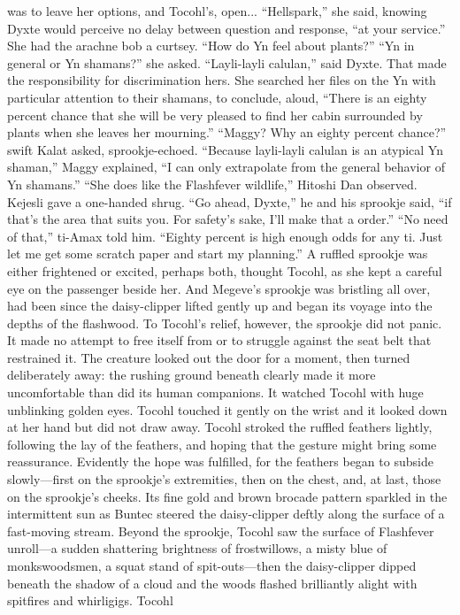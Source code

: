\documentclass[9pt]{article}
\begin{document}
was to leave her options, and Tocohl’s, open...
“Hellspark,” she said, knowing Dyxte would perceive no delay between question and response, “at
your service.” She had the arachne bob a curtsey.
“How do Yn feel about plants?”
“Yn in general or Yn shamans?” she asked.
“Layli-layli calulan,” said Dyxte.
That made the responsibility for discrimination hers. She searched her files on the Yn with particular
attention to their shamans, to conclude, aloud, “There is an eighty percent chance that she will be very
pleased to find her cabin surrounded by plants when she leaves her mourning.”
“Maggy? Why an eighty percent chance?” swift Kalat asked, sprookje-echoed.
“Because layli-layli calulan is an atypical Yn shaman,” Maggy explained, “I can only extrapolate
from the general behavior of Yn shamans.”
“She does like the Flashfever wildlife,” Hitoshi Dan observed.
Kejesli gave a one-handed shrug. “Go ahead, Dyxte,” he and his sprookje said, “if that’s the area
that suits you. For safety’s sake, I’ll make that a order.”
“No need of that,” ti-Amax told him. “Eighty percent is high enough odds for any ti. Just let me get
some scratch paper and start my planning.”
A ruffled sprookje was either frightened or excited, perhaps both, thought Tocohl, as she kept a
careful eye on the passenger beside her. And Megeve’s sprookje was bristling all over, had been since
the daisy-clipper lifted gently up and began its voyage into the depths of the flashwood.
To Tocohl’s relief, however, the sprookje did not panic. It made no attempt to free itself from or to
struggle against the seat belt that restrained it. The creature looked out the door for a moment, then
turned deliberately away: the rushing ground beneath clearly made it more uncomfortable than did its
human companions. It watched Tocohl with huge unblinking golden eyes.
Tocohl touched it gently on the wrist and it looked down at her hand but did not draw away. Tocohl
stroked the ruffled feathers lightly, following the lay of the feathers, and hoping that the gesture might
bring some reassurance. Evidently the hope was fulfilled, for the feathers began to subside slowly—first
on the sprookje’s extremities, then on the chest, and, at last, those on the sprookje’s cheeks. Its fine gold
and brown brocade pattern sparkled in the intermittent sun as Buntec steered the daisy-clipper deftly
along the surface of a fast-moving stream.
Beyond the sprookje, Tocohl saw the surface of Flashfever unroll—a sudden shattering brightness of
frostwillows, a misty blue of monkswoodsmen, a squat stand of spit-outs—then the daisy-clipper dipped
beneath the shadow of a cloud and the woods flashed brilliantly alight with spitfires and whirligigs. Tocohl
\end{document}
